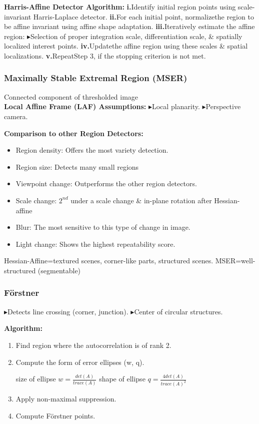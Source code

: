 \documentclass{../cheat}
\def \itm{{\tiny$\blacktriangleright$}}
\begin{document}
\begin{multicols}{3}
		\textbf{Harris-Affine Detector Algorithm:}
		\textbf{i.}Identify initial region points using scale-invariant Harris-Laplace detector.
		\textbf{ii.}For each initial point, normalizethe region to be affine invariant using affine shape adaptation.
		\textbf{iii.}Iteratively estimate the affine region:
			\itm Selection of proper integration scale, differentiation scale, \& spatially localized interest points.
		\textbf{iv.}Updatethe affine region using these scales \& spatial localizations.
		\textbf{v.}RepeatStep 3, if the stopping criterion is not met.

		\subsubsection{Maximally Stable Extremal Region (MSER)}
		Connected component of thresholded image\\
		\textbf{Local Affine Frame (LAF) Assumptions:}
		\itm Local planarity.
		\itm Perspective camera.
		
		\textbf{Comparison to other Region Detectors:}
		\begin{itemize}
			\item Region density: Offers the most variety detection.
			\item Region size: Detects many small regions
			\item Viewpoint change: Outperforms the other region detectors.
			\item Scale change: $2^{nd}$ under a scale change \& in-plane rotation after Hessian-affine
			\item Blur: The most sensitive to this type of change in image.
			\item Light change: Shows the highest repeatability score.
		\end{itemize}
		
		Hessian-Affine=textured scenes, corner-like parts, structured scenes. 
		MSER=well-structured (segmentable)
		
		\subsubsection{F\"{o}rstner}
		\itm Detects line crossing (corner, junction).
		\itm Center of circular structures.
		
		\textbf{Algorithm:}
		\begin{enumerate}[label=\roman*, nolistsep, leftmargin=1em]
			\item Find region where the autocorrelation is of rank 2.
			\item Compute the form of error ellipses (w, q). \\
				\centerline{size of ellipse $w=\frac{det(A)}{trace(A)}$
				shape of ellipse $q=\frac{4 det(A)}{trace(A)^2}$}
			\item Apply non-maximal suppression.
			\item Compute F\"{o}rstner points.
		\end{enumerate}


\end{multicols}
\end{document}
